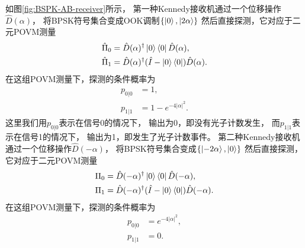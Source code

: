 如图\ref{fig:BSPK-AB-receiver}所示，
第一种Kennedy接收机通过一个位移操作$\hat{D}(\alpha)$，
将BPSK符号集合变成OOK调制$\{\ket{0}, \ket{2\alpha}\}$
然后直接探测，它对应于二元POVM测量
\begin{equation}
\begin{split}
\hat{\Pi}_0 &= \hat{D}(\alpha)^\dagger \ket{0}\bra{0} \hat{D}(\alpha) ,\\
\hat{\Pi}_1 &= \hat{D}(\alpha)^\dagger (\hat{I} - \ket{0}\bra{0}) \hat{D}(\alpha) .
\end{split}
\end{equation}
在这组POVM测量下，探测的条件概率为
\begin{equation}
\begin{split}
p_{0|0} &= 1, \\
p_{1|1} &= 1 - e^{-4|\alpha|^2}.
\end{split}
\end{equation}
这里我们用$p_{0|0}$表示在信号0的情况下，
输出为0，即没有光子计数发生，
而$p_{1|1}$表示在信号1的情况下，
输出为1，即发生了光子计数事件。
第二种Kennedy接收机通过一个位移操作$\hat{D}(-\alpha)$，
将BPSK符号集合变成$\{ \ket{-2\alpha}, \ket{0}\}$
然后直接探测，它对应于二元POVM测量
\begin{equation}
\begin{split}
\Pi_0 &= \hat{D}(-\alpha)^\dagger \ket{0}\bra{0} \hat{D}(-\alpha) ,\\
\Pi_1 &= \hat{D}(-\alpha)^\dagger (\hat{I} - \ket{0}\bra{0}) \hat{D}(-\alpha) .
\end{split}
\end{equation}
在这组POVM测量下，探测的条件概率为
\begin{equation}
\begin{split}
p_{0|0} &= e^{-4|\alpha|^2}, \\
p_{1|1} &= 0.
\end{split}
\end{equation}

